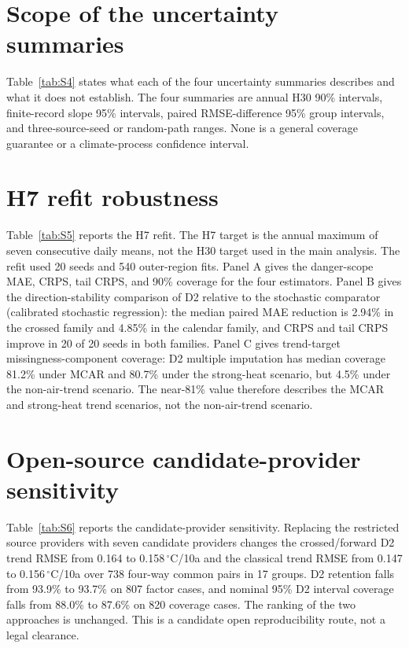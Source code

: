 \documentclass[preprint,12pt]{elsarticle}
\begin{document}


\section{Scope of the uncertainty summaries}
Table~\ref{tab:S4} states what each of the four uncertainty summaries describes and what it does not establish. The four summaries are annual H30 90\% intervals, finite-record slope 95\% intervals, paired RMSE-difference 95\% group intervals, and three-source-seed or random-path ranges. None is a general coverage guarantee or a climate-process confidence interval.



\section{H7 refit robustness}
Table~\ref{tab:S5} reports the H7 refit. The H7 target is the annual maximum of seven consecutive daily means, not the H30 target used in the main analysis. The refit used 20 seeds and 540 outer-region fits. Panel A gives the danger-scope MAE, CRPS, tail CRPS, and 90\% coverage for the four estimators. Panel B gives the direction-stability comparison of D2 relative to the stochastic comparator (calibrated stochastic regression): the median paired MAE reduction is 2.94\% in the crossed family and 4.85\% in the calendar family, and CRPS and tail CRPS improve in 20 of 20 seeds in both families. Panel C gives trend-target missingness-component coverage: D2 multiple imputation has median coverage 81.2\% under MCAR and 80.7\% under the strong-heat scenario, but 4.5\% under the non-air-trend scenario. The near-81\% value therefore describes the MCAR and strong-heat trend scenarios, not the non-air-trend scenario.



\section{Open-source candidate-provider sensitivity}
Table~\ref{tab:S6} reports the candidate-provider sensitivity. Replacing the restricted source providers with seven candidate providers changes the crossed/forward D2 trend RMSE from 0.164 to 0.158\,$^{\circ}$C/10a and the classical trend RMSE from 0.147 to 0.156\,$^{\circ}$C/10a over 738 four-way common pairs in 17 groups. D2 retention falls from 93.9\% to 93.7\% on 807 factor cases, and nominal 95\% D2 interval coverage falls from 88.0\% to 87.6\% on 820 coverage cases. The ranking of the two approaches is unchanged. This is a candidate open reproducibility route, not a legal clearance.
\end{document}
